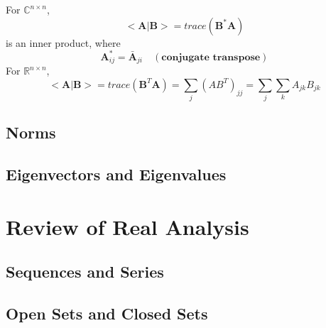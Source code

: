 			\begin{example}
				For $\mathbb{C}^{n\times n}$, 
				\begin{equation}
					<\mathbf{A}|\mathbf{B}> = trace(\mathbf{B}^* \mathbf{A})
				\end{equation}
				is an inner product, where
				\begin{equation}
					\mathbf{A}^*_{ij} = \bar{\mathbf{A}}_{ji} \quad (\textbf{conjugate transpose})
				\end{equation}
				For $\mathbb{R}^{n\times n}$,
				\begin{equation}
					<\mathbf{A}|\mathbf{B}> = trace(\mathbf{B}^T \mathbf{A}) = \sum_j (AB^T)_{jj} = \sum_j\sum_k A_{jk}B_{jk}
				\end{equation}
			\end{example}
			
		\section{Norms}

		\section{Eigenvectors and Eigenvalues}

		\section{}

	\chapter{Review of Real Analysis}
		\section{Sequences and Series}

		\section{Open Sets and Closed Sets}
